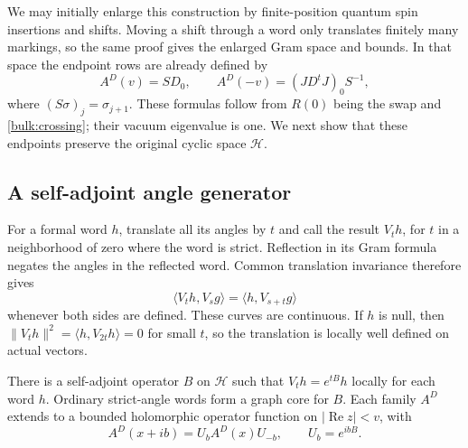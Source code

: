 We may initially enlarge this construction by finite-position
quantum spin insertions and shifts. Moving a shift through a word
only translates finitely many markings, so the same proof gives
the enlarged Gram space and bounds. In that space the endpoint
rows are already defined by
\begin{equation}\label{bulk:endpoint-rows}
 A^D(v)=SD_0,\qquad
 A^D(-v)=(JD^tJ)_0S^{-1},
\end{equation}
where $(S\sigma)_j=\sigma_{j+1}$. These formulas follow from
$R(0)$ being the swap and \eqref{bulk:crossing}; their vacuum
eigenvalue is one. We next show that these endpoints preserve the
original cyclic space $\mathcal H$.

\subsection{A self-adjoint angle generator}

For a formal word $h$, translate all its angles by $t$ and call the
result $V_th$, for $t$ in a neighborhood of zero where the word is
strict. Reflection in its Gram formula negates the angles in the
reflected word. Common translation invariance therefore gives
\begin{equation}\label{bulk:hankel}
 \langle V_th,V_sg\rangle=\langle h,V_{s+t}g\rangle
\end{equation}
whenever both sides are defined. These curves are continuous. If
$h$ is null, then
$\|V_th\|^2=\langle h,V_{2t}h\rangle=0$ for small $t$, so the
translation is locally well defined on actual vectors.

\begin{lemma}\label{bulk:boost}
There is a self-adjoint operator $B$ on $\mathcal H$ such that
$V_th=e^{tB}h$ locally for each word $h$. Ordinary strict-angle words
form a graph core for $B$. Each family $A^D$ extends to a bounded
holomorphic operator function on $|\operatorname{Re}z|<v$, with
\begin{equation}\label{bulk:imaginary-covariance}
 A^D(x+ib)=U_bA^D(x)U_{-b},\qquad U_b=e^{ibB}.
\end{equation}
\end{lemma}

